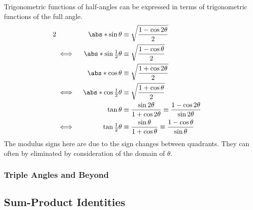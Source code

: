 \begin{theorem} \label{thm_trig_half_angle}
Trigonometric functions of half-angles can be expressed in terms of
trigonometric functions of the full angle.
\begin{alignat*}2
    &&\abs*{\sin \theta} &\equiv
        \sqrt{\frac{1 - \cos 2 \theta} 2} \\
    &\iff{}& \abs*{\sin \tfrac 12 \theta} &\equiv
        \sqrt{\frac{1 - \cos \theta} 2} \\
    &&\abs*{\cos \theta} &\equiv
        \sqrt{\frac{1 + \cos 2 \theta} 2} \\
    &\iff{}& \abs*{\cos \tfrac 12 \theta} &\equiv
        \sqrt{\frac{1 + \cos \theta} 2} \\
    &&\tan \theta &\equiv
        \frac{\sin 2 \theta}{1 + \cos 2 \theta}
        \equiv \frac{1 - \cos 2 \theta}{\sin 2 \theta} \\
    &\iff{}& \tan \tfrac 12 \theta &\equiv
        \frac{\sin \theta}{1 + \cos \theta}
        \equiv \frac{1 - \cos \theta}{\sin \theta}
\end{alignat*}
The modulus signs here are due to the sign changes between quadrants. They can
often by eliminated by consideration of the domain of \(\theta\).
\end{theorem}

\subsubsection{Triple Angles and Beyond}

\subsection{Sum-Product Identities} \label{sec_trig_sum_product}

